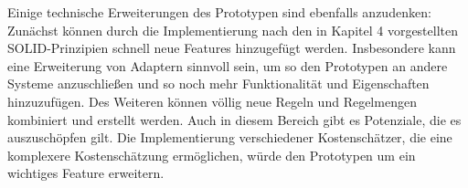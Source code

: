 Einige technische Erweiterungen des Prototypen sind ebenfalls anzudenken: Zunächst  können durch die Implementierung nach den in Kapitel 4 vorgestellten SOLID-Prinzipien schnell neue Features hinzugefügt werden. Insbesondere kann eine Erweiterung von Adaptern sinnvoll sein, um so den Prototypen an andere Systeme anzuschließen und so noch mehr Funktionalität und Eigenschaften hinzuzufügen. Des Weiteren können völlig neue Regeln und Regelmengen kombiniert und erstellt werden. Auch in diesem Bereich gibt es Potenziale, die es auszuschöpfen gilt. Die Implementierung verschiedener Kostenschätzer, die eine komplexere Kostenschätzung ermöglichen, würde den Prototypen um ein wichtiges Feature erweitern. 




